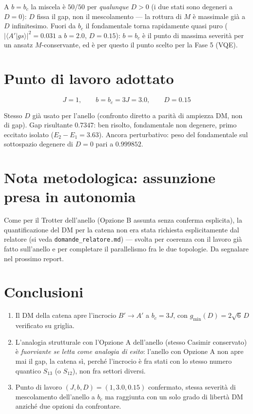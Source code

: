 \documentclass[11pt,a4paper]{article}
\begin{document}
A $b=b_c$ la miscela è $50/50$ per \emph{qualunque} $D>0$ (i due stati sono
degeneri a $D=0$): $D$ fissa il gap, non il mescolamento — la rottura di $M$ è
massimale già a $D$ infinitesimo. Fuori da $b_c$ il fondamentale torna rapidamente
quasi puro ($|\langle A'|gs\rangle|^2=0.031$ a $b=2.0$, $D=0.15$): $b=b_c$ è il
punto di massima severità per un ansatz $M$-conservante, ed è per questo il punto
scelto per la Fase 5 (VQE).

\section{Punto di lavoro adottato}

\[
\boxed{J=1,\qquad b=b_c=3J=3.0,\qquad D=0.15}
\]

Stesso $D$ già usato per l'anello (confronto diretto a parità di ampiezza DM, non
di gap). Gap risultante $0.7347$: ben risolto, fondamentale non degenere, primo
eccitato isolato ($E_2-E_1=3.63$). Ancora perturbativo: peso del fondamentale sul
sottospazio degenere di $D=0$ pari a $0.999852$.

\section{Nota metodologica: assunzione presa in autonomia}

Come per il Trotter dell'anello (Opzione B assunta senza conferma esplicita), la
quantificazione del DM per la catena non era stata richiesta esplicitamente dal
relatore (si veda \texttt{domande\_relatore.md}) — svolta per coerenza con il lavoro
già fatto sull'anello e per completare il parallelismo fra le due topologie. Da
segnalare nel prossimo report.

\section{Conclusioni}

\begin{enumerate}[leftmargin=1.4em]
\item Il DM della catena apre l'incrocio $B'\to A'$ a $b_c=3J$, con
$g_\text{min}(D)=2\sqrt6\,D$ verificato su griglia.
\item L'analogia strutturale con l'Opzione A dell'anello (stesso Casimir
conservato) è \emph{fuorviante se letta come analogia di esito}: l'anello con
Opzione A non apre mai il gap, la catena sì, perché l'incrocio è fra stati con lo
stesso numero quantico $S_{13}$ (o $S_{12}$), non fra settori diversi.
\item Punto di lavoro $(J,b,D)=(1,3.0,0.15)$ confermato, stessa severità di
mescolamento dell'anello a $b_c$ ma raggiunta con un solo grado di libertà DM
anziché due opzioni da confrontare.
\end{enumerate}
\end{document}
